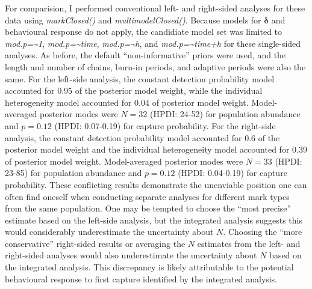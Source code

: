 \documentclass[12pt]{article}
\begin{document}
For comparision, I performed conventional left- and right-sided analyses for these data using \textit{markClosed()} and \textit{multimodelClosed()}. Because models for ${\boldsymbol \delta}$ and behavioural response do not apply, the candidiate model set was limited to \textit{mod.p={\~{}}1}, \textit{mod.p={\~{}}time}, \textit{mod.p={\~{}}h}, and \textit{mod.p={\~{}}time+h} for these single-sided analyses. As before, the default ``non-informative'' priors were used, and the length and number of chains, burn-in periods, and adaptive periods were also the same. For the left-side analysis, the constant detection probability model accounted for 0.95 of the posterior model weight, while the individual heterogeneity model accounted for 0.04 of posterior model weight. Model-averaged posterior modes were $N=32$ (HPDI: 24-52) for population abundance and $p=0.12$ (HPDI: 0.07-0.19) for capture probability. 
For the right-side analysis, the constant detection probability model accounted for 0.6 of the posterior model weight and the individual heterogeneity model accounted for 0.39 of posterior model weight. Model-averaged posterior modes were $N=33$ (HPDI: 23-85) for population abundance and $p=0.12$ (HPDI: 0.04-0.19) for capture probability. These conflicting results demonstrate the unenviable position one can often find oneself when conducting separate analyses for different mark types from the same population. One may be tempted to choose the ``most precise'' estimate based on the left-side analysis, but the integrated analysis suggests this would considerably underestimate the uncertainty about $N$. Choosing the ``more conservative'' right-sided results or averaging the $N$ estimates from the left- and right-sided analyses would also underestimate the uncertainty about $N$ based on the integrated analysis. This discrepancy is likely attributable to the potential behavioural response to first capture identified by the integrated analysis. 
\end{document}
